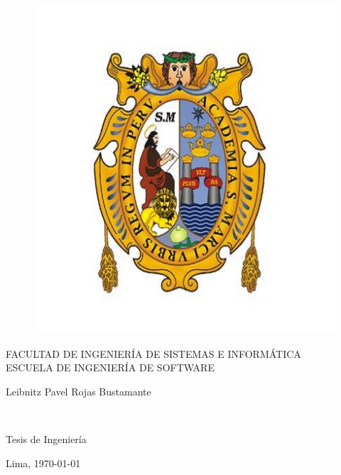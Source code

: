\begin{titlepage}
\begin{center}
    \vspace*{-1in}
    \begin{figure}[htb]
        \begin{center}
            \includegraphics[scale=0.5]{./figuras/escudo_unmsm.jpg}
        \end{center}
    \end{figure}
    FACULTAD DE INGENIERÍA DE SISTEMAS E INFORMÁTICA\\
    \vspace*{0.5cm}
    ESCUELA DE INGENIERÍA DE SOFTWARE \\
    \vspace*{1cm}
    \begin{large}
    \end{large}
    \vspace*{1cm}
    \begin{center}
        Leibnitz Pavel Rojas Bustamante
    \end{center}
    \vspace*{2cm}
    \begin{Large}
    \textbf{\miTesisTitulo} \\
    \end{Large}
    \vspace*{2cm}
    \begin{large}
        Tesis de Ingeniería\\
    \end{large}
    \vspace*{3cm}
    \begin{flushright}
    Lima, \today
    \end{flushright}
\end{center}
\end{titlepage}
